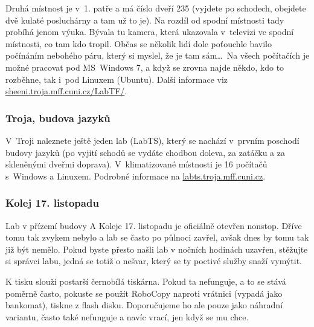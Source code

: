 Druhá místnost je v~1. patře a má číslo dveří 235 (vyjdete po
schodech, obejdete dvě kulaté posluchárny a tam už to je). Na rozdíl od spodní místnosti tady probíhá jenom výuka.
Bývala tu kamera, která ukazovala v~televizi ve spodní místnosti, co tam kdo tropil.
Občas se několik lidí dole
poťouchle bavilo počínáním nebohého páru, který si myslel, že je
tam sám\dots\ Na všech počítačích je možné pracovat pod
MS~Windows 7, a když se zrovna najde někdo, kdo to rozběhne, tak
i~pod Linuxem (Ubuntu). Další informace viz \url{sheeni.troja.mff.cuni.cz/LabTF/}.


\subsubsection{Troja, budova jazyků}

V~Troji naleznete ještě jeden lab (LabTS), který se nachází
v~prvním poschodí budovy jazyků (po vyjití schodů se vydáte chodbou
doleva, za zatáčku a za skleněnými dveřmi doprava).
V~klimatizované místnosti je 16 počítačů s~Windows a Linuxem.
Podrobné informace na \url{labts.troja.mff.cuni.cz}.

\subsubsection{Kolej 17. listopadu}

Lab v přízemí budovy A Koleje 17. listopadu je oficiálně otevřen nonstop. Dříve tomu tak zvykem nebylo a lab se často po
půlnoci zavřel, avšak dnes by tomu tak již být nemělo. Pokud byste přesto našli lab v nočních hodinách uzavřen, stěžujte
si správci labu, jedná se totiž o nešvar, který se ty poctivé služby snaží vymýtit.

K tisku slouží postarší černobílá tiskárna. Pokud ta nefunguje, a to se stává poměrně často, pokuste se použít RoboCopy
naproti vrátnici (vypadá jako bankomat), tiskne z flash disku. Doporučujeme ho ale pouze jako náhradní variantu, často
také nefunguje a navíc vrací, jen když se mu chce.


%
%
